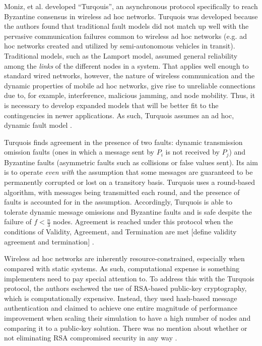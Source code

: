 \documentclass[twoside, conference]{IEEEtran}
\begin{document}

Moniz, et al. developed ``Turqouis'', an asynchronous protocol specifically to reach Byzantine consensus in wireless ad hoc networks. Turquois was developed because the authors found that traditional fault models did not match up well with the pervasive communication failures common to wireless ad hoc networks (e.g. ad hoc networks created and utilized by semi-autonomous vehicles in transit). Traditional models, such as the Lamport model, assumed general reliability among the \textit{links} of the different nodes in a system. That applies well enough to standard wired networks, however, the nature of wireless communication and the dynamic properties of mobile ad hoc networks, give rise to unreliable connections due to, for example, interference, malicious jamming, and node mobility. Thus, it is necessary to develop expanded models that will be better fit to the contingencies in newer applications. As such, Turquois assumes an ad hoc, dynamic fault model \cite{Moniz2013}.

Turquois finds agreement in the presence of two faults: dynamic transmission omission faults (ones in which a message sent by $P_i$ is not received by $P_j$) and Byzantine faults (asymmetric faults such as collisions or false values sent). Its aim is to operate \textit{even with} the assumption that some messages are guaranteed to be permanently corrupted or lost on a transitory basis. Turquois uses a  round-based algorithm, with messages being transmitted each round, and the presence of faults is accounted for in the assumption. Accordingly, Turquois is able to tolerate dynamic message omissions and Byzantine faults and is safe despite the failure of $f < \frac{n}{3}$ nodes. Agreement is reached under this protocol when the conditions of Validity, Agreement, and Termination are met [define validity agreement and termination] \cite{Moniz2013}.

Wireless ad hoc networks are inherently resource-constrained, especially when compared with static systems. As such, computational expense is something implementers need to pay special attention to. To address this with the Turquois protocol, the authors eschewed the use of RSA-based public-key cryptography, which is computationally expensive. Instead, they used hash-based message authentication and claimed to achieve one entire magnitude of performance improvement when scaling their simulation to have a high number of nodes and comparing it to a public-key solution. There was no mention about whether or not eliminating RSA compromised security in any way \cite{Moniz2013}.
\end{document}
